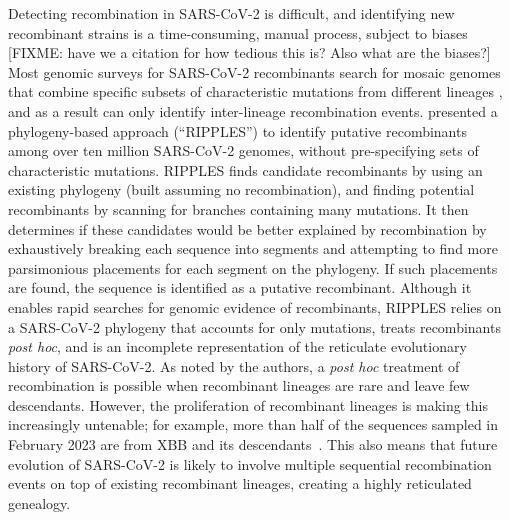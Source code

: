 \documentclass{article}
\begin{document}
Detecting recombination in SARS-CoV-2 is difficult, and identifying new
recombinant strains is a time-consuming, manual process, subject
to biases [FIXME: have we a citation for how tedious this is? Also what
are the biases?]
Most genomic surveys for SARS-CoV-2 recombinants search for mosaic genomes that
combine specific subsets of characteristic mutations from different lineages
\citep[e.g.,][]{VanInsberghe2021-eu,Jackson2021-ik,Wertheim2022-hj,Sekizuka2022-xz},
and as a result can only identify inter-lineage recombination events.
\cite{Turakhia2022-it} presented a
phylogeny-based approach (``RIPPLES'') to identify putative recombinants among
over ten million SARS-CoV-2 genomes, without pre-specifying sets of characteristic
mutations.
RIPPLES finds candidate recombinants by using an existing phylogeny
(built assuming no recombination), and finding potential recombinants
by  scanning for branches containing many mutations.
It then determines if these candidates would be better explained by
recombination by exhaustively breaking each
sequence into segments and attempting to find more parsimonious placements for
each segment on the phylogeny. If such placements are found, the sequence is
identified as a putative recombinant. Although it enables rapid searches for
genomic evidence of recombinants, RIPPLES relies on a SARS-CoV-2 phylogeny that
accounts for only mutations, treats recombinants \textit{post hoc}, and is an
incomplete representation of the reticulate evolutionary history of SARS-CoV-2.
As noted by the authors, a \textit{post hoc} treatment of recombination is
possible when recombinant lineages are rare and leave few descendants. However,
the proliferation of recombinant lineages is making this increasingly
untenable; for example, more than half of the sequences sampled in February 2023
are from XBB and its descendants~\citep{Chen2022-pz}. This also means that
future evolution of SARS-CoV-2 is likely to involve multiple sequential
recombination events on top of existing recombinant lineages, creating a highly
reticulated genealogy.
\end{document}

